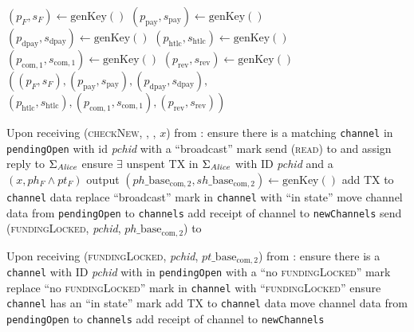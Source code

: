 \begin{algorithmic}[1]
     
      \State $\left(p_F, s_F\right) \gets \mathrm{genKey}\left(\right)$
      \State $\left(p_{\mathrm{pay}}, s_{\mathrm{pay}}\right) \gets
      \mathrm{genKey}\left(\right)$ 
      \State $\left(p_{\mathrm{dpay}}, s_{\mathrm{dpay}}\right) \gets
      \mathrm{genKey}\left(\right)$ 
      \State $\left(p_{\mathrm{htlc}}, s_{\mathrm{htlc}}\right) \gets
      \mathrm{genKey}\left(\right)$ 
      \State $\left(p_{\mathrm{com}, 1}, s_{\mathrm{com}, 1}\right) \gets
      \mathrm{genKey}\left(\right)$ 
      \State $\left(p_{\mathrm{rev}}, s_{\mathrm{rev}}\right) \gets
      \mathrm{genKey}\left(\right)$ 
      \State \Return $\left(\left(p_F, s_F\right), \left(p_{\mathrm{pay}},
      s_{\mathrm{pay}}\right), \left(p_{\mathrm{dpay}},
      s_{\mathrm{dpay}}\right),\right.$
      \Indent
        \State $\left.\left(p_{\mathrm{htlc}}, s_{\mathrm{htlc}}\right),
        \left(p_{\mathrm{com}, 1}, s_{\mathrm{com}, 1}\right),
        \left(p_{\mathrm{rev}}, s_{\mathrm{rev}}\right)\right)$
      \EndIndent
    \EndFunction
    \State

    \State {}
    \State Upon receiving (\textsc{checkNew}, \alice, \bob, $x$) from
    \environment: 
    \Indent
      \State ensure there is a matching \texttt{channel} in \texttt{pendingOpen}
      with id \textit{pchid} with a ``broadcast'' mark
      \State send (\textsc{read}) to \ledger{} and assign reply to
      $\Sigma_{\mathit{Alice}}$
      \State ensure $\exists$ unspent TX in $\Sigma_{\mathit{Alice}}$ with ID
      \textit{pchid} and a $\left(x, ph_F \wedge pt_F\right)$ output
      \State $\left(ph\_\mathrm{base}_{\mathrm{com}, 2},
      sh\_\mathrm{base}_{\mathrm{com}, 2}\right) \gets
      \mathrm{genKey}\left(\right)$
      \State add TX to \texttt{channel} data \State replace ``broadcast'' mark
      in \texttt{channel} with ``in state''
        \State move channel data from \texttt{pendingOpen} to \texttt{channels}
        \State add receipt of channel to \texttt{newChannels}
      \EndIf
      \State send (\textsc{fundingLocked}, \textit{pchid},
      $ph\_\mathrm{base}_{\mathrm{com}, 2}$) to \bob{}
    \EndIndent
    \State

    \State Upon receiving (\textsc{fundingLocked}, \textit{pchid},
    $pt\_\mathrm{base}_{\mathrm{com}, 2}$) from \bob:
    \Indent
      \State ensure there is a \texttt{channel} with ID \textit{pchid} with
      \bob{} in \texttt{pendingOpen} with a ``no \textsc{fundingLocked}'' mark
      \State replace ``no \textsc{fundingLocked}'' mark in \texttt{channel} with
      ``\textsc{fundingLocked}''
      \State ensure \texttt{channel} has an ``in state'' mark
      \State add TX to \texttt{channel} data
      \State move channel data from \texttt{pendingOpen} to \texttt{channels}
      \State add receipt of channel to \texttt{newChannels}
    \EndIndent
    \State


\end{algorithmic}
